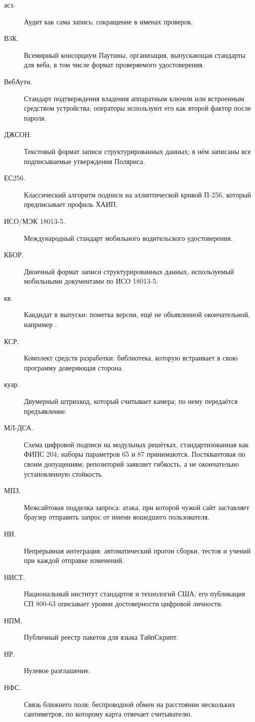 \begin{description}
  \item[асз.] Аудит как сама запись; сокращение в именах проверок.
  \item[В3К.] Всемирный консорциум Паутины, организация, выпускающая стандарты для веба, в том числе формат проверяемого удостоверения.
  \item[ВебАутн.] Стандарт подтверждения владения аппаратным ключом или встроенным средством устройства; операторы используют его как второй фактор после пароля.
  \item[ДЖСОН.] Текстовый формат записи структурированных данных; в нём записаны все подписываемые утверждения Поляриса.
  \item[ЕС256.] Классический алгоритм подписи на эллиптической кривой П-256, который предписывает профиль ХАИП.
  \item[ИСО/МЭК 18013-5.] Международный стандарт мобильного водительского удостоверения.
  \item[КБОР.] Двоичный формат записи структурированных данных, используемый мобильными документами по ИСО 18013-5.
  \item[кв.] Кандидат в выпуски: пометка версии, ещё не объявленной окончательной, например .
  \item[КСР.] Комплект средств разработки: библиотека, которую встраивает в свою программу доверяющая сторона.
  \item[куар.] Двумерный штрихкод, который считывает камера; по нему передаётся предъявление.
  \item[МЛ-ДСА.] Схема цифровой подписи на модульных решётках, стандартизованная как ФИПС 204; наборы параметров 65 и 87 принимаются. Постквантовая по своим допущениям; репозиторий заявляет гибкость, а не окончательно установленную стойкость.
  \item[МПЗ.] Межсайтовая подделка запроса: атака, при которой чужой сайт заставляет браузер отправить запрос от имени вошедшего пользователя.
  \item[НИ.] Непрерывная интеграция: автоматический прогон сборки, тестов и учений при каждой отправке изменений.
  \item[НИСТ.] Национальный институт стандартов и технологий США; его публикация СП 800-63 описывает уровни достоверности цифровой личности.
  \item[НПМ.] Публичный реестр пакетов для языка ТайпСкрипт.
  \item[НР.] Нулевое разглашение.
  \item[НФС.] Связь ближнего поля: беспроводной обмен на расстоянии нескольких сантиметров, по которому карта отвечает считывателю.

\end{description}
